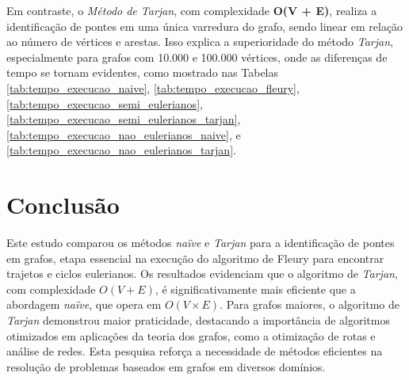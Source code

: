 Em contraste, o \textit{Método de Tarjan}, com complexidade \textbf{O(V + E)}, realiza a identificação de pontes em uma única varredura do grafo, sendo linear em relação ao número de vértices e arestas. Isso explica a superioridade do método \textit{Tarjan}, especialmente para grafos com 10.000 e 100.000 vértices, onde as diferenças de tempo se tornam evidentes, como mostrado nas Tabelas \ref{tab:tempo_execucao_naive}, \ref{tab:tempo_execucao_fleury}, \ref{tab:tempo_execucao_semi_eulerianos}, \ref{tab:tempo_execucao_semi_eulerianos_tarjan}, \ref{tab:tempo_execucao_nao_eulerianos_naive}, e \ref{tab:tempo_execucao_nao_eulerianos_tarjan}.


\section*{Conclusão}

Este estudo comparou os métodos \textit{naïve} e \textit{Tarjan} para a identificação de pontes em grafos, etapa essencial na execução do algoritmo de Fleury para encontrar trajetos e ciclos eulerianos. Os resultados evidenciam que o algoritmo de\textit{ Tarjan}, com complexidade \textbf{\(O(V + E)\)}, é significativamente mais eficiente que a abordagem \textit{naïve}, que opera em \textbf{\(O(V \times E)\)}. Para grafos maiores, o algoritmo de \textit{Tarjan} demonstrou maior praticidade, destacando a importância de algoritmos otimizados em aplicações da teoria dos grafos, como a otimização de rotas e análise de redes. Esta pesquisa reforça a necessidade de métodos eficientes na resolução de problemas baseados em grafos em diversos domínios.


% 
